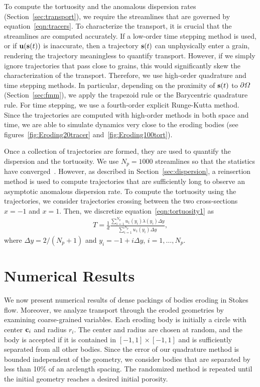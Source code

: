 \documentclass{jfm}
\begin{document}
To compute the tortuosity and the anomalous dispersion rates
(Section~\ref{sec:transport}), we require the streamlines that are
governed by equation~\eqref{eqn:tracers}.  To characterize the
transport, it is crucial that the streamlines are computed accurately.
If a low-order time stepping method is used, or if $\uu(\ss(t))$ is
inaccurate, then a trajectory $\ss(t)$ can unphysically enter a grain,
rendering the trajectory meaningless to quantify transport.  However, if
we simply ignore trajectories that pass close to grains, this would
significantly skew the characterization of the transport. Therefore, we
use high-order quadrature and time stepping methods.  In particular,
depending on the proximity of $\ss(t)$ to $\bd\Omega$
(Section~\ref{sec:fmm}), we apply the trapezoid rule or the Barycentric
quadrature rule.  For time stepping, we use a fourth-order explicit
Runge-Kutta method.  Since the trajectories are computed with high-order
methods in both space and time,  we are able to simulate dynamics very
close to the eroding bodies (see figures~\ref{fig:Eroding20tracer}
and~\ref{fig:Eroding100tort}).

Once a collection of trajectories are formed, they are used to quantify
the dispersion and the tortuosity.  We use $N_p = 1000$ streamlines so
that the statistics have converged~\citep{bel-sal-rin1992}.  However, as
described in Section~\ref{sec:dispersion}, a reinsertion method is used
to compute trajectories that are sufficiently long to observe an
asymptotic anomalous dispersion rate.  To compute the tortuosity using
the trajectories, we consider trajectories crossing between the two
cross-sections $x=-1$ and $x=1$.  Then, we discretize
equation~\eqref{eqn:tortuosity1} as
\begin{align}
  T = \frac{1}{d}\frac{\displaystyle\sum_{i=1}^{N_p} 
    u_1(y_i) \lambda(y_i) \Delta y}
  {\displaystyle\sum_{i=1}^{N_p} u_1(y_i) \Delta y}, 
\end{align}
where $\Delta y = 2/(N_p + 1)$ and $y_i = -1 + i \Delta y$,
$i=1,\ldots,N_p$.  

\section{Numerical Results}
\label{sec:results}
We now present numerical results of dense packings of bodies eroding in
Stokes flow. Moreover, we analyze transport through the eroded
geometries by examining coarse-grained variables.  Each eroding body is
initially a circle with center $\cc_i$ and radius $r_i$.  The center and
radius are chosen at random, and the body is accepted if it is contained
in $[-1,1] \times [-1,1]$ and is sufficiently separated from all other
bodies.  Since the error of our quadrature method is bounded independent
of the geometry, we consider bodies that are separated by less than 10\%
of an arclength spacing.  The randomized method is repeated until the
initial geometry reaches a desired initial porosity.
\end{document}
